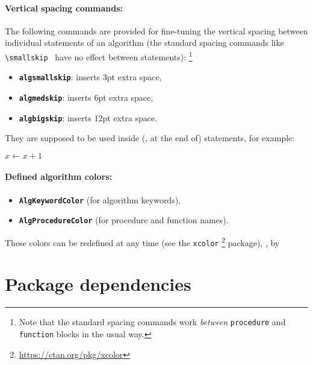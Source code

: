 \documentclass[english]{hgbarticle}
\begin{document}
\paragraph{Vertical spacing commands:}
The following commands are provided for fine-tuning the vertical spacing
between individual statements of an algorithm (the standard spacing commands
like \verb!\smallskip! \etc\ have no effect between statements):%
\footnote{Note that the standard spacing commands work \emph{between}
\texttt{procedure} and \texttt{function} blocks in the usual way.}
\begin{itemize}
    \item \textbf{{\bs}\texttt{algsmallskip}}: inserts 3pt extra space,
    \item \textbf{{\bs}\texttt{algmedskip}}: inserts 6pt extra space,
    \item \textbf{{\bs}\texttt{algbigskip}}: inserts 12pt extra space.
\end{itemize}
They are supposed to be used inside (\ie, at the end of) statements, for
example:
%
\begin{LaTeXCode}[numbers=none]
    \State $x \gets x + 1$ \algsmallskip
\end{LaTeXCode}

\paragraph{Defined algorithm colors:}
\begin{itemize}
    \item \textbf{\texttt{AlgKeywordColor}} (for algorithm keywords),
    \item \textbf{\texttt{AlgProcedureColor}} (for procedure and function
    names).
\end{itemize}
These colors can be redefined at any time (see the \texttt{xcolor}%
\footnote{\url{https://ctan.org/pkg/xcolor}}
package), \eg, by
\begin{LaTeXCode}[numbers=none]
\end{LaTeXCode}


\section{Package dependencies}
\end{document}

